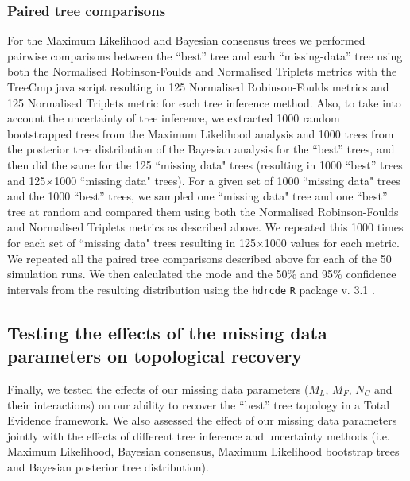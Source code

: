 \subsubsection*{Paired tree comparisons}
\label{tree_comparisons}
For the Maximum Likelihood and Bayesian consensus trees we performed pairwise comparisons between the ``best'' tree and each ``missing-data'' tree using both the Normalised Robinson-Foulds and Normalised Triplets metrics with the TreeCmp java script \citep{Bogdanowicz2012} resulting in 125 Normalised Robinson-Foulds metrics and 125 Normalised Triplets metric for each tree inference method.
Also, to take into account the uncertainty of tree inference, we extracted 1000 random bootstrapped trees from the Maximum Likelihood analysis and 1000 trees from the posterior tree distribution of the Bayesian analysis for the ``best'' trees, and then did the same for the 125 ``missing data" trees (resulting in 1000 ``best'' trees and 125$\times$1000 ``missing data" trees). 
For a given set of 1000 ``missing data" trees and the 1000 ``best'' trees, we sampled one ``missing data" tree and one ``best'' tree at random and compared them using both the Normalised Robinson-Foulds and Normalised Triplets metrics as described above.
We repeated this 1000 times for each set of ``missing data" trees resulting in 125$\times$1000 values for each metric.
We repeated all the paired tree comparisons described above for each of the 50 simulation runs.
We then calculated the mode and the 50\% and 95\% confidence intervals from the resulting distribution using the \texttt{hdrcde} \texttt{R} package v. 3.1 \citep{hdrcde}.

\subsection{Testing the effects of the missing data parameters on topological recovery}
Finally, we tested the effects of our missing data parameters ($M_{L}$, $M_{F}$, $N_{C}$ and their interactions) on our ability to recover the ``best'' tree topology in a Total Evidence framework.
We also assessed the effect of our missing data parameters jointly with the effects of different tree inference and uncertainty methods (i.e. Maximum Likelihood, Bayesian consensus, Maximum Likelihood bootstrap trees and Bayesian posterior tree distribution).

